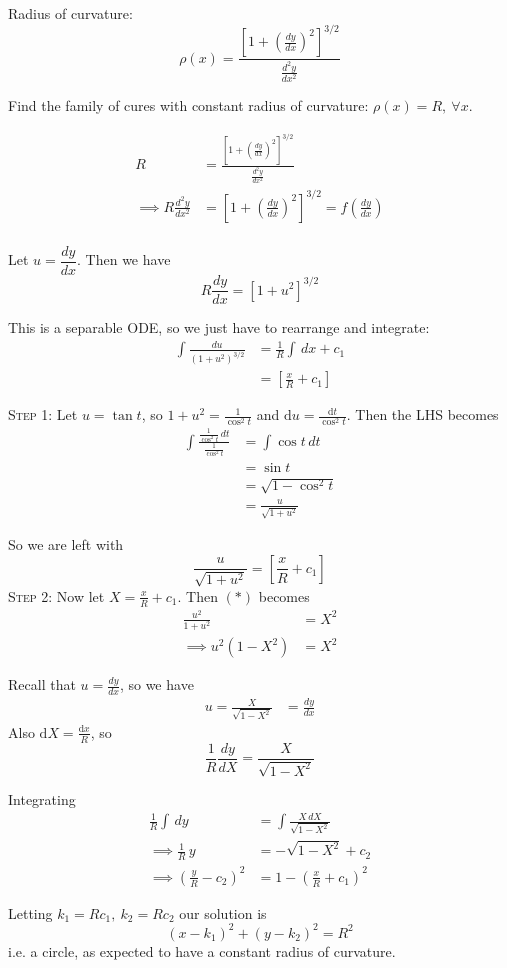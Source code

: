 \documentclass[10pt]{scrartcl}
\begin{document}
\begin{example}[Geometry]
Radius of curvature: 
\[\rho(x) = \frac{\left[1 + \left(\frac{dy}{dx}\right)^2\right]^{3/2}}{\frac{d^2y}{dx^2}}\]

Find the family of cures with constant radius of curvature: $\rho(x) = R,~\forall x$. 

\[
\begin{aligned}
  R &= \frac{\left[1 + \left(\frac{dy}{dx}\right)^2\right]^{3/2}}{\frac{d^2y}{dx^2}}\\[.3cm]
\implies   R\frac{d^2y}{dx^2} &= \left[1 + \left(\frac{dy}{dx}\right)^2\right]^{3/2} = f\left(\frac{dy}{dx}\right)\\
\end{aligned}
\]

Let $u = \dfrac{dy}{dx}$. Then we have
\[R\frac{dy}{dx} = [1 + u^2]^{3/2}\]

This is a separable ODE, so we just have to rearrange and integrate: 
\begin{align*}
	\int \frac{du}{(1+u^2)^{3/2}} &= \frac{1}{R}\int \,dx + c_1\\[.2cm]
	&= \left[\frac{x}{R} + c_1\right]
\end{align*}

\textsc{Step 1:} Let $u = \tan t$, so $1 + u^2 = \frac{1}{\cos^2t}$ and $\mathrm{d}u = \frac{\mathrm{d}t}{\cos^2t}$. Then the LHS becomes
\[
\begin{aligned}
  \int \frac{\frac{1}{\cos^2t}\,dt}{\frac{1}{\cos^2t}} &= \int \cos t\,dt\\
  &= \sin t\\
  &= \sqrt{1-\cos^2t}\\
  &= \frac{u}{\sqrt{1+u^2}}
\end{aligned}
\]

So we are left with
\[\frac{u}{\sqrt{1+u^2}} = \left[\frac{x}{R}+c_1\right] \tag{$*$}\]
\textsc{Step 2:} Now let $X = \frac{x}{R} + c_1$. Then $(*)$ becomes
\setlength{\jot}{8pt}
\[
\begin{aligned}
  \frac{u^2}{1+u^2} &= X^2\\
\implies   u^2(1-X^2) &= X^2\end{aligned}
\]

Recall that $u = \frac{dy}{dx}$, so we have
\setlength{\jot}{8pt}
\[
\begin{aligned}
  u = \frac{X}{\sqrt{1-X^2}} &= \frac{dy}{dx}
\end{aligned}
  \]
Also  $\mathrm{d}X = \frac{\mathrm{d}x}{R}$, so 
\[
    \frac{1}{R}\frac{dy}{dX} = \frac{X}{\sqrt{1-X^2}}
\]

Integrating
  \[\begin{aligned}  
  \frac{1}{R}\int\,dy &= \int \frac{X\,dX}{\sqrt{1-X^2}}\\
  \implies   \frac{1}{R}\, y &= -\sqrt{1-X^2} + c_2\\
\implies   \left(\frac{y}{R}-c_2\right)^2 &= 1-\left(\frac{x}{R} + c_1\right)^2
\end{aligned}
\]

Letting $k_1 = Rc_1,~ k_2 = Rc_2$ our solution is
\[(x-k_1)^2 + (y-k_2)^2 = R^2\]
i.e. a circle, as expected to have a constant radius of curvature.	
\end{example}\vsp
\end{document}
